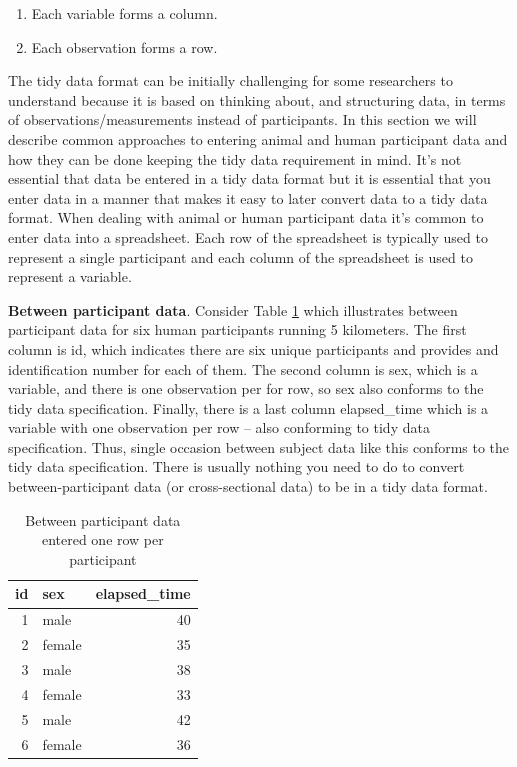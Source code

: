 \documentclass[
]{krantz}
\begin{document}
\begin{enumerate}
\def\labelenumi{\arabic{enumi}.}
\item
  Each variable forms a column.
\item
  Each observation forms a row.
\end{enumerate}

The tidy data format can be initially challenging for some researchers to understand because it is based on thinking about, and structuring data, in terms of observations/measurements instead of participants. In this section we will describe common approaches to entering animal and human participant data and how they can be done keeping the tidy data requirement in mind. It's not essential that data be entered in a tidy data format but it is essential that you enter data in a manner that makes it easy to later convert data to a tidy data format. When dealing with animal or human participant data it's common to enter data into a spreadsheet. Each row of the spreadsheet is typically used to represent a single participant and each column of the spreadsheet is used to represent a variable.

\textbf{Between participant data}. Consider Table \ref{tab:betweenex} which illustrates between participant data for six human participants running 5 kilometers. The first column is id, which indicates there are six unique participants and provides and identification number for each of them. The second column is sex, which is a variable, and there is one observation per for row, so sex also conforms to the tidy data specification. Finally, there is a last column elapsed\_time which is a variable with one observation per row -- also conforming to tidy data specification. Thus, single occasion between subject data like this conforms to the tidy data specification. There is usually nothing you need to do to convert between-participant data (or cross-sectional data) to be in a tidy data format.

\begin{table}

\caption{\label{tab:betweenex}Between participant data entered one row per participant}
\centering
\begin{tabular}[t]{rlr}
\toprule
id & sex & elapsed\_time\\
\midrule
1 & male & 40\\
2 & female & 35\\
3 & male & 38\\
4 & female & 33\\
5 & male & 42\\
6 & female & 36\\
\bottomrule
\end{tabular}
\end{table}
\end{document}
